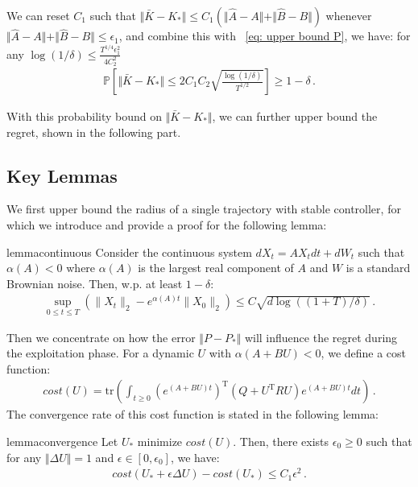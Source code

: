 \documentclass{article}
\theoremstyle{definition}
\begin{document}
 We can reset $C_{1}$ such that
$\Vert \bar{K}-K_{*}\Vert\leq C_{1}\left(\Vert\hat{A}-A\Vert+\Vert\hat{B}-B\Vert\right)$ whenever $\Vert\hat{A}-A\Vert+\Vert\hat{B}-B\Vert\leq \epsilon_{1}$, and combine this with ~\eqref{eq: upper bound P}, we have: for any $\log(1/\delta)\leq \frac{T^{1/4}\epsilon^{2}_{1}}{4C_{2}^{2}}$
\begin{align}\label{eq: upper bound K}
\mathbb{P}\left[\Vert \bar{K}-K_{*}\Vert \leq 2C_{1}C_{2}\sqrt{\frac{\log(1/\delta)}{T^{1/2}}}\right]\geq 1-\delta\,.    
\end{align}

With this probability bound on $\Vert \bar{K}-K_{*}\Vert$, we can further upper bound the regret, shown in the following part.
\subsection{Key Lemmas}

We first upper bound the radius of a single trajectory with stable controller, for which we introduce and provide a proof for the following lemma:

\begin{restatable}{lemma}{continuous}
\label{lem:bound continuous trajectory}
Consider the continuous system $dX_{t}=AX_{t}dt+dW_{t}$ such that $\alpha(A)<0$ where $\alpha(A)$ is the largest real component of $A$ and $W$ is a standard Brownian noise. Then, w.p. at least $1-\delta$:
	\begin{align*}
	\sup_{0\leq t\leq T}\left(\|X_{t}\|_{2}-e^{\alpha(A)t}\|X_{0}\|_{2}\right)\leq C\sqrt{d\log((1+T)/\delta)}\,.
	\end{align*}  
\end{restatable}

Then we concentrate on how the error $\Vert P-P_{*}\Vert$ will influence the regret during the exploitation phase.
For a dynamic $U$ with $\alpha(A+BU)<0$, we define a cost function:
\begin{align*}\label{eq:cost function}
cost(U)=\mathrm{tr}\left(\int_{t\geq 0}(e^{(A+BU)t})^{\mathrm{T}}(Q+U^{\mathrm{T}}RU)e^{(A+BU)t}dt\right)\,.   
\end{align*}
The convergence rate of this cost function is stated in the following lemma:

\begin{restatable}{lemma}{convergence}
\label{lem:convergence of cost}
Let $U_{*}$ minimize $cost(U)$. Then, there exists $\epsilon_{0}\geq 0$ such that for any $\Vert \Delta U\Vert=1$ and $\epsilon\in[0,\epsilon_0]$, we have:
\begin{align*}
    cost(U_{*}+\epsilon\Delta U)-cost(U_{*})\leq C_{1}\epsilon^{2}\,.
\end{align*}
\end{restatable}
\end{document}
